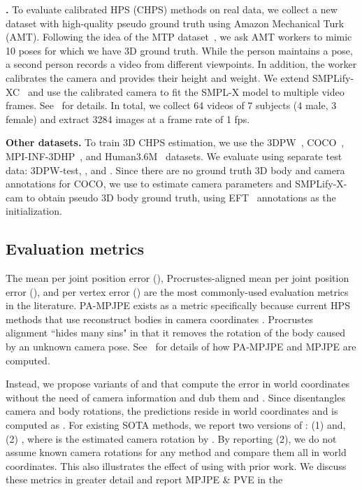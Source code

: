 \documentclass[10pt,twocolumn,letterpaper,usenames,dvipsnames]{article}
\begin{document}
\textbf{\mtpcam.} 
To evaluate calibrated HPS (CHPS) methods on real data, we collect a new dataset with high-quality pseudo ground truth using Amazon Mechanical Turk (AMT).
Following the idea of the MTP dataset~\cite{Mueller:CVPR:21}, we ask AMT workers to mimic 10 poses for which we have 3D ground truth. 
While the person maintains a pose, a second person records a video from different viewpoints.
In addition, the worker calibrates the camera
and provides their height and weight.
We extend SMPLify-XC~\cite{Mueller:CVPR:21} and use the calibrated camera to fit the SMPL-X model to multiple video frames. See \supmat~for details.
In total, we collect 64 videos of 7 subjects (4 male, 3 female) and extract 3284 
images at a frame rate of 1 fps. 

\textbf{Other datasets.} 
To train 3D CHPS estimation, we use the 3DPW~\cite{vonMarcard2018_3dpw}, COCO~\cite{coco}, MPI-INF-3DHP~\cite{mpiiinf3dhp_mono-2017}, and Human3.6M~\cite{ionescu_h36m} datasets. 
We evaluate \methodname using separate test data: 3DPW-test, \agoracam, and \mtpcam. 
Since there are no ground truth 3D body and camera annotations for COCO, we use \camcalib to estimate camera parameters and SMPLify-X-cam to obtain pseudo 3D body ground truth, using EFT~\cite{joo2020eft} annotations as the initialization.


\subsection{Evaluation metrics} 
\label{sec:metrics}
The mean per joint position error (\mpjpe), Procrustes-aligned mean per joint position error (\pampjpe), and per vertex error (\pve) are the most commonly-used evaluation metrics in the literature. 
PA-MPJPE exists as a metric specifically because current HPS methods that use \iwcam reconstruct bodies in camera coordinates . Procrustes alignment ``hides many sins" in that it removes the rotation of the body caused by an unknown camera pose. 
See \supmat~for details of how PA-MPJPE and MPJPE are computed.

Instead, we propose variants of \mpjpe and \pve that compute the error in world coordinates without the need of camera information and dub them \wmpjpe and \wpve. 
Since \methodname disentangles camera and body rotations, the predictions reside in world coordinates  
and \wmpjpe is computed as . 
For existing SOTA methods, we report two versions of \wmpjpe: 
(1) 
and,
(2) , where  is the estimated camera rotation by \camcalib.
By reporting (2), we do not assume known camera rotations for any method and compare them all in world coordinates. 
This also illustrates the effect of using \camcalib with prior work. 
We discuss these metrics in greater detail and report MPJPE \& PVE in the \supmat
\end{document}
